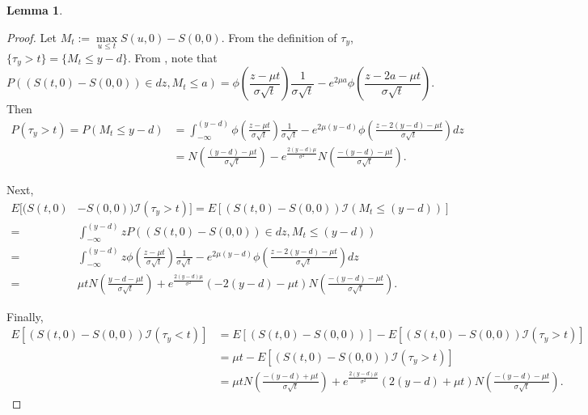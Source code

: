 \documentclass[11pt]{article}
\theoremstyle{plain}
\numberwithin{equation}{section}
\newtheorem{lem}[thm]{Lemma}
\newcommand{\Red}{\color{Red}}
\begin{document}
{{\begin{lem}
\end{lem}

\begin{proof}
	{\Red  Let $M_t:=\max\limits_{u\leq t} S(u,0)-S(0,0)$. From the definition of $\tau_y$, $\{ \tau_y>t\}= \{ M_t \leq y-d\}$.
	From \citet{jeanblanc2009mathematical}, note that 
	$$P((S(t,0)-S(0,0))\in dz, M_t\leq a)= \phi\left(\frac{z-\mu t}{\sigma\sqrt{t}}\right)\frac{1}{\sigma\sqrt{t}} -e^{2\mu a}\phi\left(\frac{z-2a-\mu t}{\sigma\sqrt{t}}\right).$$
		Then
		\begin{align*}
			P(\tau_y>t)= P( M_t \leq y-d) &= 
		\int_{-\infty}^{(y-d)}
		\phi\left(\frac{z-\mu t}{\sigma\sqrt{t}}\right)\frac{1}{\sigma\sqrt{t}} -e^{2\mu (y-d)}\phi\left(\frac{z-2(y-d)-\mu t}{\sigma\sqrt{t}}\right) dz
		\\
		&=N\left(\frac{(y-d)-\mu t}{\sigma\sqrt{t}}\right)-e^{\frac{2(y-d)\mu }{\sigma^2} } N\left(\frac{-(y-d)-\mu t}{\sigma\sqrt{t}}\right).
		\end{align*} 
		
		Next, 
	\begin{align*}
		E[(S(t,0)&-S(0,0))\mathcal{I}(\tau_y>t)]=E[(S(t,0)-S(0,0))\mathcal{I}(M_t\leq (y-d))]
		\\
		=&\int_{-\infty}^{(y-d)} z P((S(t,0)-S(0,0))\in dz, M_t\leq (y-d))\\
		=& \int_{-\infty}^{(y-d)} z
		\phi\left(\frac{z-\mu t}{\sigma\sqrt{t}}\right)\frac{1}{\sigma\sqrt{t}} -e^{2\mu (y-d)}\phi\left(\frac{z-2(y-d)-\mu t}{\sigma\sqrt{t}}\right) dz
		\\
		=&\mu t N\left(\frac{y-d-\mu t}{\sigma\sqrt{t}}\right) +e^{\frac{2(y-d)\mu }{\sigma^2} }(-2(y-d)-\mu t)  N\left(\frac{-(y-d)-\mu t}{\sigma\sqrt{t}}\right). 
	\end{align*}
	
	Finally, 
	\begin{align*}
			E[(S(t,0)-S(0,0))\mathcal{I}(\tau_y<t)]&=E[(S(t,0)-S(0,0))]-E[(S(t,0)-S(0,0))\mathcal{I}(\tau_y>t)]\\
	&=\mu t - E[(S(t,0)-S(0,0))\mathcal{I}(\tau_y>t)]\\
	&= \mu t N\left(\frac{-(y-d)+\mu t}{\sigma\sqrt{t}}\right) +e^{\frac{2(y-d)\mu }{\sigma^2} }(2(y-d)+\mu t)  N\left(\frac{-(y-d)-\mu t}{\sigma\sqrt{t}}\right).
	\end{align*}
	
	}
	
	
%	
\end{proof}

}}
\end{document}
